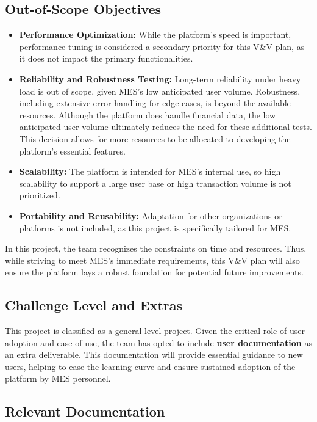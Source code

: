 \documentclass[12pt, titlepage]{article}
\begin{document}
\subsection{Out-of-Scope Objectives}

\begin{itemize}
    \item \textbf{Performance Optimization:} While the platform’s speed is important, performance tuning is considered a secondary priority for this V\&V plan, as it does not impact the primary functionalities.
    \item \textbf{Reliability and Robustness Testing:} Long-term reliability under heavy load is out of scope, given MES's low anticipated user volume. Robustness, including extensive error handling for edge cases, is beyond the available resources. Although the platform does handle financial data, the low anticipated user volume ultimately reduces the need for these additional tests. This decision allows for more resources to be allocated to developing the platform's essential features.
    \item \textbf{Scalability:} The platform is intended for MES's internal use, so high scalability to support a large user base or high transaction volume is not prioritized.
    \item \textbf{Portability and Reusability:} Adaptation for other organizations or platforms is not included, as this project is specifically tailored for MES.
\end{itemize}

In this project, the team recognizes the constraints on time and resources. Thus, while striving to meet MES’s immediate requirements, this V\&V plan will also ensure the platform lays a robust foundation for potential future improvements.

\subsection{Challenge Level and Extras}

This project is classified as a general-level project. Given the critical role of user adoption and ease of use, the team has opted to include \textbf{user documentation} as an extra deliverable. This documentation will provide essential guidance to new users, helping to ease the learning curve and ensure sustained adoption of the platform by MES personnel.

\subsection{Relevant Documentation}
\end{document}
